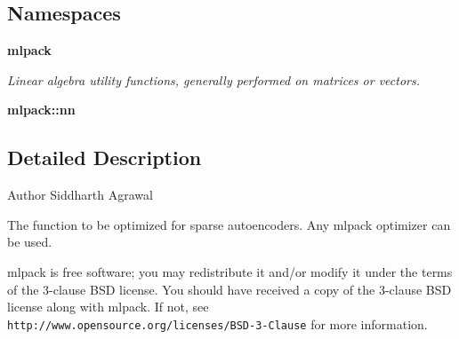 \subsection*{Namespaces}
\begin{DoxyCompactItemize}
\item 
 \textbf{ mlpack}
\begin{DoxyCompactList}\small\item\em Linear algebra utility functions, generally performed on matrices or vectors. \end{DoxyCompactList}\item 
 \textbf{ mlpack\+::nn}
\end{DoxyCompactItemize}


\subsection{Detailed Description}
\begin{DoxyAuthor}{Author}
Siddharth Agrawal
\end{DoxyAuthor}
The function to be optimized for sparse autoencoders. Any mlpack optimizer can be used.

mlpack is free software; you may redistribute it and/or modify it under the terms of the 3-\/clause B\+SD license. You should have received a copy of the 3-\/clause B\+SD license along with mlpack. If not, see {\tt http\+://www.\+opensource.\+org/licenses/\+B\+S\+D-\/3-\/\+Clause} for more information. 
